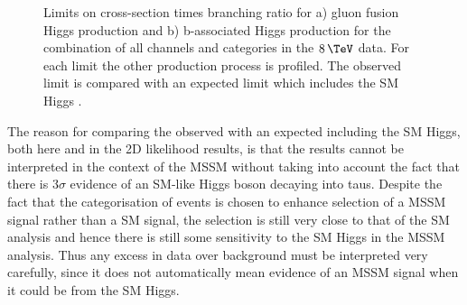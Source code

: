 \begin{figure}[tbh]
\caption[Limits on cross-section times branching ratio for a) gluon fusion Higgs
production and b) b-associated Higgs production for the combination of all
channels and categories in the $8\,\TeV$ data.]{Limits on cross-section times branching ratio for a) gluon fusion Higgs
production and b) b-associated Higgs production for the combination of all
channels and categories in the $8\,\TeV$ data. For each limit the other production process is
profiled. The observed limit is compared with an expected limit which includes
the SM Higgs \cite{HIG-13-021}.}
\label{fig:mssmModelIndependent}
\end{figure}

The reason for comparing the observed with an expected including the \ac{SM}
Higgs, both here and in the 2D likelihood results, 
is that the results cannot be interpreted in the context of the \ac{MSSM} without taking into account
the fact that there is $3\sigma$ evidence of an \ac{SM}-like Higgs boson decaying
into taus. Despite the fact that the categorisation of events is chosen to
enhance selection of a \ac{MSSM} signal rather than a \ac{SM} signal, the
selection is still very close to that of the \ac{SM} analysis and hence there is
still some sensitivity to the \ac{SM} Higgs in the \ac{MSSM} analysis. Thus any
excess in data over background must be interpreted very carefully, since it
does not automatically mean evidence of an \ac{MSSM} signal when it could be
from the \ac{SM} Higgs. 

